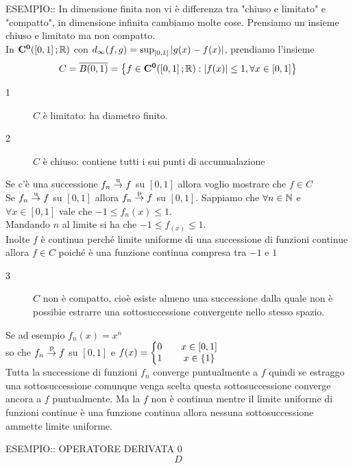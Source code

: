 ESEMPIO:: In dimensione finita non vi è differenza tra "chiuso e limitato" e "compatto", in dimensione infinita cambiamo molte cose.
Prensiamo un insieme chiuso e limitato ma non compatto.\\
In $\mathbf{C^{0}}(\left[0,1\right]; \mathbb{R})$ con $d_\infty(f,g)=\sup_{\left[0,1\right]}\left|g(x)-f(x)\right|$, prendiamo l'insieme
\[C=\overline{B(0,1)}=\left\{f\in \mathbf{C^{0}}(\left[0,1\right]; \mathbb{R}):\left|f(x)\right| \leq 1, \forall x \in\left[0,1\right]\right\}\]
\begin{description}
	\item[1] $C$ è limitato: ha diametro finito.
	\item[2] $C$ è chiuso: contiene tutti i sui punti di accumualazione
\end{description}
Se c'è una successione $f_n \overset{\text{u}}{\to} f$ su $\left[0,1\right]$ allora voglio mostrare che $f\in C$\\
Se $f_n \overset{\text{u}}{\to} f$ su $\left[0,1\right]$ allora $f_n \overset{\text{p}}{\to} f$ su $\left[0,1\right]$.
Sappiamo che $\forall n\in\mathbb{N}$ e $\forall x\in \left[0,1\right]$ vale che $-1 \leq f_n(x) \leq 1$.\\
Mandando $n$ al limite si ha che $-1 \leq f_(x) \leq 1$.\\
Inolte $f$ è continua perché limite uniforme di una successione di funzioni continue allora $f\in C$ poiché è una funzione continua compresa tra $-1$ e $1$
\begin{description}
	\item[3] $C$ non è compatto, cioè esiste almeno una successione dalla quale non è possibie estrarre una sottosuccessione convergente nello stesso spazio.
\end{description}
Se ad esempio $f_n(x) = x^n$\\
so che $f_n \overset{\text{p}}{\to} f$ su $\left[0,1\right]$ e $f(x)=\left\{\begin{matrix}0&&x\in\left[0,1\right]\\1&&x\in\left\{1\right\}\end{matrix}\right.$\\
Tutta la successione di funzioni $f_n$ converge puntualmente a $f$ quindi se estraggo una sottosuccessione comunque venga scelta questa sottosuccessione converge ancora a $f$ puntualmente. Ma la $f$ non è continua mentre il limite uniforme di funzioni continue è una funzione continua allora nessuna sottosuccessione ammette limite uniforme.

ESEMPIO:: OPERATORE DERIVATA 0\\
\[D\]

